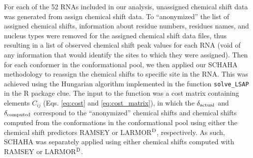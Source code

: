 \documentclass[journal=jcisd8,manuscript=article,layout=onecolumn]{achemso}
\begin{document}
For each of the 52 RNAs included in our analysis, unassigned chemical shift data was generated from assign chemical shift data. To  ``anonymized''  the list of assigned chemical shifts, information about residue numbers, residues names, and nucleus types were removed for the assigned chemical shift data files, thus resulting in a list of observed chemical shift peak values for each RNA (void of any information that would identify the sites to which they were assigned). Then for each conformer in the conformational pool, we then applied our SCHAHA methodology to reassign the chemical shifts to specific site in the RNA. This was achieved using the Hungarian algorithm implemented in the function {\texttt{solve\_LSAP}} in the R package clue\cite{hornik2005a}. The input to the function was a cost matrix containing elements $C_{ij}$ (Eqs. \ref{eq:cost} and \ref{eq:cost_matrix}), in which the $\delta_{\rm actual}$ and $\delta_{\rm computed}$ correspond to the ``anonymized''  chemical shifts and chemical shifts computed from the conformations in the conformational pool using either the chemical shift predictors RAMSEY\cite{frank2013prediction} or LARMOR$^{\rm D}$\cite{frank2014simple}, respectively. As such, SCHAHA was separately applied using either chemical shifts computed with RAMSEY\cite{frank2013prediction} or LARMOR$^{\rm D}$.
\end{document}
